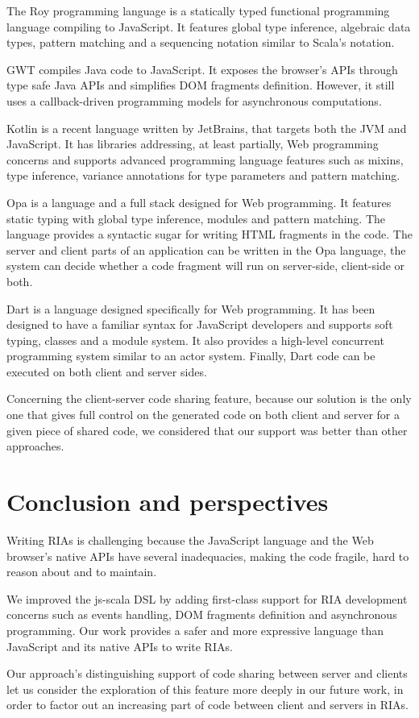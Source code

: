 \documentclass[american,english,runningheads]{llncs}
\begin{document}
The Roy programming language is a statically typed functional programming language compiling to JavaScript. It
features global type inference, algebraic data types, pattern matching and a sequencing notation similar to Scala’s
 notation.

GWT compiles Java code to JavaScript. It exposes the browser’s APIs through type safe Java APIs and simplifies DOM
fragments definition. However, it still uses a callback-driven programming models for asynchronous computations.

Kotlin is a recent language written by JetBrains, that targets both the JVM and JavaScript. It has libraries
addressing, at least partially, Web programming concerns and supports advanced programming language features such as
mixins, type inference, variance annotations for type parameters and pattern matching.

Opa is a language and a full stack designed for Web programming. It features static typing with global
type inference, modules and pattern matching. The language provides a syntactic sugar for writing HTML fragments in
the code. The server and client parts of an application can be written in the Opa language, the system can decide
whether a code fragment will run on server-side, client-side or both.

Dart is a language designed specifically for Web programming. It has been designed to have a familiar syntax for
JavaScript developers and supports soft typing, classes and a module system. It also provides a high-level concurrent
programming system similar to an actor system. Finally, Dart code can be executed on both client and server sides.

Concerning the client-server code sharing feature, because our solution is the only one that gives full control on
the generated code on both client and server for a given piece of shared code, we considered that our support was
better than other approaches.

\section{Conclusion and perspectives}
\label{discussion}

Writing RIAs is challenging because the JavaScript language and the Web browser’s native APIs have several
inadequacies, making the code fragile, hard to reason about and to maintain.

We improved the js-scala DSL by adding first-class support for RIA development concerns such as events handling,
DOM fragments definition and asynchronous programming. Our work provides a safer and more expressive language than
JavaScript and its native APIs to write RIAs.

Our approach’s distinguishing support of code sharing between server and clients let us consider the exploration of
this feature more deeply in our future work, in order to factor out an increasing part of code between client and
servers in RIAs.



\end{document}
